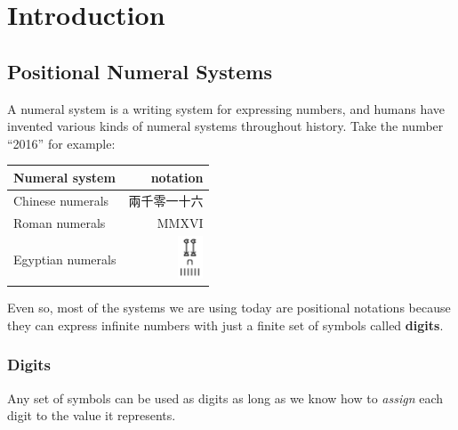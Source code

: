 \documentclass[\main/thesis.tex]{subfiles}
\begin{document}
\graphicspath{ {images/}{../images/} }

\chapter{Introduction}\label{introduction}

\section{Positional Numeral Systems}

A numeral system is a writing system for expressing numbers, and humans have
invented various kinds of numeral systems throughout history.
Take the number ``2016'' for example:

\begin{center}
    \begin{tabular}{ | l | r | }
    \textbf{Numeral system} & \textbf{notation}  \\
    \hline
    Chinese numerals    & 兩千零一十六    \\
    Roman numerals      & MMXVI         \\
    Egyptian numerals   & \includegraphics[width=2em]{egyptian/2016.png} \\
    \end{tabular}
\end{center}

Even so, most of the systems we are using today are positional notations\cite{knuth1998art}
because they can express infinite numbers with just a finite set of symbols called \textbf{digits}.

\subsection{Digits}

Any set of symbols can be used as digits as long as we know how to \textit{assign}
each digit to the value it represents.
\end{document}
